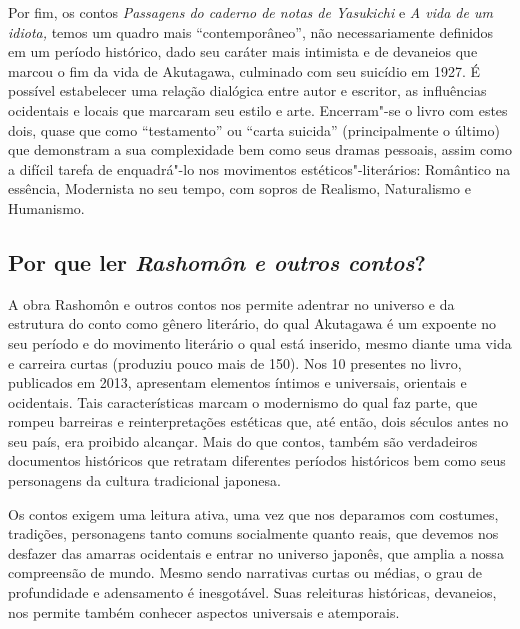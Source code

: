 \documentclass[12pt]{extarticle}
\begin{document}

Por fim, os contos \emph{Passagens do caderno de notas de Yasukichi} e
\emph{A vida de um idiota,} temos um quadro mais ``contemporâneo'', não
necessariamente definidos em um período histórico, dado seu caráter mais
intimista e de devaneios que marcou o fim da vida de Akutagawa,
culminado com seu suicídio em 1927. É possível estabelecer uma relação
dialógica entre autor e escritor, as influências ocidentais e locais que
marcaram seu estilo e arte. Encerram"-se o livro com estes dois, quase
que como ``testamento'' ou ``carta suicida'' (principalmente o último)
que demonstram a sua complexidade bem como seus dramas pessoais, assim
como a difícil tarefa de enquadrá"-lo nos movimentos
estéticos"-literários: Romântico na essência, Modernista no seu tempo,
com sopros de Realismo, Naturalismo e Humanismo.


\subsection{Por que ler \textit{Rashomôn e outros contos}?}

A obra Rashomôn e outros contos nos permite adentrar no universo e da
estrutura do conto como gênero literário, do qual Akutagawa é um
expoente no seu período e do movimento literário o qual está inserido,
mesmo diante uma vida e carreira curtas (produziu pouco mais de 150).
Nos 10 presentes no livro, publicados em 2013, apresentam elementos
íntimos e universais, orientais e ocidentais. Tais características
marcam o modernismo do qual faz parte, que rompeu barreiras e
reinterpretações estéticas que, até então, dois séculos antes no seu
país, era proibido alcançar. Mais do que contos, também são verdadeiros
documentos históricos que retratam diferentes períodos históricos bem
como seus personagens da cultura tradicional japonesa.


Os contos exigem uma leitura ativa, uma vez que nos deparamos com
costumes, tradições, personagens tanto comuns socialmente quanto reais,
que devemos nos desfazer das amarras ocidentais e entrar no universo
japonês, que amplia a nossa compreensão de mundo. Mesmo sendo narrativas
curtas ou médias, o grau de profundidade e adensamento é inesgotável.
Suas releituras históricas, devaneios, nos permite também conhecer
aspectos universais e atemporais.
\end{document}
